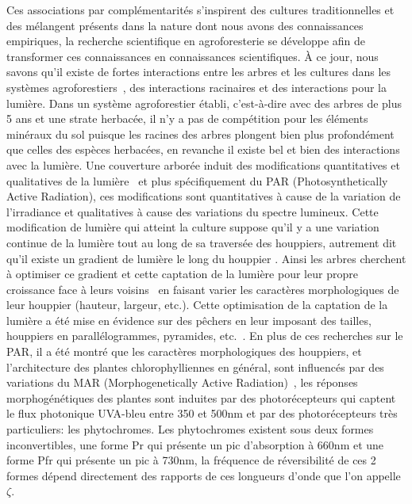 \documentclass[12pt]{report}
\begin{document}
Ces associations par complémentarités s'inspirent des cultures traditionnelles
et des mélangent présents dans la nature dont nous avons des connaissances
empiriques, la recherche scientifique en agroforesterie se développe afin de
transformer ces connaissances en connaissances scientifiques. À ce jour, nous
savons qu'il existe de fortes interactions entre les arbres et les cultures dans
les systèmes agroforestiers~\citep{AF_ref48,AF_ref49,AF_ref47},
des interactions racinaires et des interactions pour la lumière. Dans un système
agroforestier établi, c'est-à-dire avec des arbres de plus 5 ans et une strate
herbacée, il n'y a pas de compétition pour les éléments minéraux du sol puisque
les racines des arbres plongent bien plus profondément que celles des espèces
herbacées, en revanche il existe bel et bien des interactions avec la lumière.
Une couverture arborée induit des modifications quantitatives et qualitatives
de la lumière~\citep{MAR_ref36} et plus spécifiquement du PAR
(Photosynthetically Active Radiation), ces modifications sont quantitatives à
cause de la variation de l'irradiance et qualitatives à cause des variations du
spectre lumineux. Cette modification de lumière qui atteint la culture suppose
qu'il y a une variation continue de la lumière tout au long de sa traversée des
houppiers, autrement dit qu'il existe un gradient de lumière le long du houppier
\citep{MAR_ref31,MAR_ref35}. Ainsi les arbres cherchent à optimiser ce
gradient et cette captation de la lumière pour leur propre croissance face à
leurs voisins~\citep{MAR_ref52} en faisant varier les caractères morphologiques de leur
houppier (hauteur, largeur, etc.). Cette optimisation de la captation de la lumière a été mise
en évidence sur des pêchers en leur imposant des tailles, houppiers en
parallélogrammes, pyramides, etc.~\citep{MAR_ref26}. En plus de ces recherches
sur le PAR, il a été montré que les caractères morphologiques des houppiers, et
l'architecture des plantes chlorophylliennes en général, sont influencés par des
variations du MAR (Morphogenetically Active Radiation)~\citep{MAR_ref35}, les réponses
morphogénétiques des plantes sont induites par des photorécepteurs qui captent le flux
photonique UVA-bleu entre 350 et 500nm et par des photorécepteurs très particuliers: les
phytochromes. Les phytochromes existent sous deux formes inconvertibles, une
forme Pr qui présente un pic d'absorption à 660nm et une forme Pfr qui présente
un pic à 730nm, la fréquence de réversibilité de ces 2 formes dépend directement
des rapports de ces longueurs d'onde que l'on appelle $\zeta$.
\end{document}
